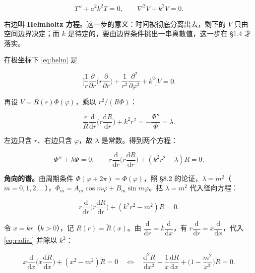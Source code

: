 \documentclass[11pt]{ctexart}
\let\origsubhdr\subhdr
\renewcommand{\subhdr}[1]{\par\needspace{3\baselineskip}\origsubhdr{#1}}
\begin{document}
\begin{equation}
T''+a^2k^2T=0,
\qquad
\nabla^2V+k^2V=0 .
\label{eq:helm}
\end{equation}

右边叫 \textbf{Helmholtz 方程}。这一步的意义：时间被彻底分离出去，剩下的 $V$ 只由空间边界决定；而 $k$ 是待定的，要由边界条件挑出一串离散值，这一步在 \S1.4 才落实。


在极坐标下 \eqref{eq:helm} 是

\begin{equation}
\Big[\frac1r\frac{\partial}{\partial r}\Big(r\frac{\partial}{\partial r}\Big)+\frac1{r^2}\frac{\partial^2}{\partial\varphi^2}+k^2\Big]V=0 .
\label{eq:helmPolar}
\end{equation}

再设 $V=R(r)\Phi(\varphi)$，乘以 $r^2/(R\Phi)$：

\begin{equation}
\frac{r}{R}\frac{\mathrm d}{\mathrm dr}\Big(r\frac{\mathrm dR}{\mathrm dr}\Big)+k^2r^2=-\frac{\Phi''}{\Phi}=\lambda .
\label{eq:sep2}
\end{equation}

左边只含 $r$、右边只含 $\varphi$，故 $\lambda$ 是常数。得到两个方程：

\begin{equation}
\Phi''+\lambda\Phi=0,
\qquad
r\frac{\mathrm d}{\mathrm dr}\Big(r\frac{\mathrm dR}{\mathrm dr}\Big)+(k^2r^2-\lambda)R=0 .
\label{eq:two}
\end{equation}

\textbf{角向的谱。}由周期条件 $\Phi(\varphi+2\pi)=\Phi(\varphi)$，照 \S8.2 的论证，$\lambda=m^2$（$m=0,1,2,\dots$），$\Phi_m=A_m\cos m\varphi+B_m\sin m\varphi$。把 $\lambda=m^2$ 代入径向方程：

\begin{equation}
r\frac{\mathrm d}{\mathrm dr}\Big(r\frac{\mathrm dR}{\mathrm dr}\Big)+(k^2r^2-m^2)R=0 .
\label{eq:radial}
\end{equation}


令 $x=kr$（$k>0$），记 $R(r)=\tilde R(x)$。由 $\dfrac{\mathrm d}{\mathrm dr}=k\dfrac{\mathrm d}{\mathrm dx}$，有 $r\dfrac{\mathrm d}{\mathrm dr}=x\dfrac{\mathrm d}{\mathrm dx}$，代入 \eqref{eq:radial} 并除以 $k^2$：

\begin{equation}
x\frac{\mathrm d}{\mathrm dx}\Big(x\frac{\mathrm d\tilde R}{\mathrm dx}\Big)+(x^2-m^2)\tilde R=0
\quad\Longleftrightarrow\quad
\frac{\mathrm d^2\tilde R}{\mathrm dx^2}+\frac1x\frac{\mathrm d\tilde R}{\mathrm dx}+\Big(1-\frac{m^2}{x^2}\Big)\tilde R=0 .
\label{eq:bessel}
\end{equation}
\end{document}
